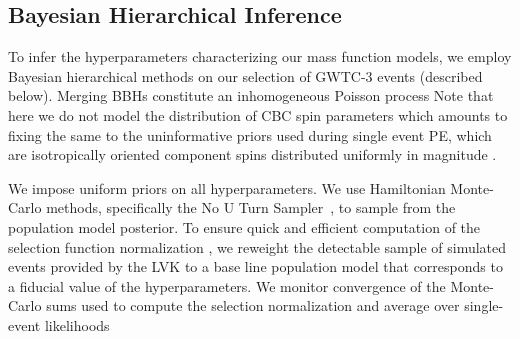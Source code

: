 \documentclass[modern]{aastex631}
\begin{document}
\subsection{Bayesian Hierarchical Inference}
\noindent
{}
To infer the hyperparameters characterizing our mass function models, we employ
Bayesian hierarchical methods on our selection of GWTC-3 events (described
below). Merging BBHs constitute an inhomogeneous Poisson
process 
Note that here we do not model the distribution of CBC spin parameters which
amounts to fixing the same to the uninformative priors used during single event
PE, which are isotropically oriented component spins distributed uniformly in
magnitude \citep{KAGRA:2021duu}.  

We impose uniform priors on all hyperparameters.  We use Hamiltonian Monte-Carlo
methods, specifically the No U Turn Sampler~\citep[NUTS, ][]{HMC, HMC-NUTS}, to
sample from the population model posterior. To ensure quick and efficient
computation of the selection function normalization \citep{Mandel:2018mve}, we
reweight the detectable sample of simulated events provided by the LVK
\citep{KAGRA:2021duu} to a base line population model that corresponds to a
fiducial value of the hyperparameters.  We monitor convergence of the
Monte-Carlo sums used to compute the selection normalization and average over
single-event likelihoods \citep{Pdet1-Farr,Pdet2-essick,Talbot2023}
\end{document}
